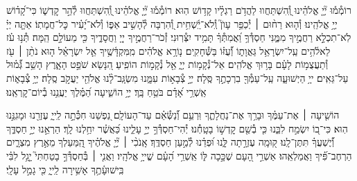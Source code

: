 \documentclass[twoside, openany, parskip=half, 11pt]{book}
\begin{document}
\newcommand{\negline}{\vspace{-\baselineskip}}

\negline

%
רוֹמְ֯מ֡וּ יְ֘יָ֤ אֱלֹהֵ֗ינוּ וְֽ֭֯הִשְׁתַּחֲווּ לַהֲדֹ֥ם רַגְלָ֗יו קָד֥וֹשׁ הֽוּא׃
רוֹמְ֯מ֡וּ יְ֘יָ֤ אֱלֹהֵ֗ינוּ וְֽ֭֯הִשְׁתַּחֲווּ לְ֯הַ֣ר קׇדְשׁ֑וֹ כִּי־קָ֝ד֗וֹשׁ יְיָ֥ אֱלֹהֵֽינוּ׃
%
וְ֯ה֤וּא רַח֨וּם ׀ יְ֯כַפֵּ֥ר עָוֺן֮ וְֽ֯לֹא־יַֽ֫שְׁחִ֥ית וְ֭֯הִרְבָּה לְ֯הָשִׁ֣יב אַפּ֑וֹ
וְ֯לֹא־יָ֝עִ֗יר כׇּל־חֲמָתֽוֹ׃
%
אַתָּ֤ה יְיָ֗ לֹֽא־תִכְלָ֣א רַחֲמֶ֣יךָ מִמֶּ֑נִּי חַסְדְּ֯ךָ֥ וַ֝אֲמִתְּ֯ךָ֗ תָּמִ֥יד יִצְּ֯רֽוּנִי׃
זְ֯כֹר־רַחֲמֶ֣יךָ יְיָ֭ וַחֲסָדֶ֑יךָ כִּ֖י מֵעוֹלָ֣ם הֵֽמָּה׃
תְּ֯נ֥וּ עֹ֗ז לֵאלֹ֫הִ֥ים עַֽל־יִשְׂרָאֵ֥ל גַּאֲוָת֑וֹ וְ֯֝עֻזּ֗וֹ בַּשְּׁ֯חָקִֽים׃
נ֤וֹרָ֥א אֱלֹהִ֗ים מִֽמִּקְדָּ֫שֶׁ֥יךָ אֵ֤ל יִשְׂרָאֵ֗ל
ה֤וּא נֹתֵ֨ן ׀ עֹ֖ז וְ֯תַעֲצֻמ֥וֹת לָעָ֗ם בָּר֥וּךְ אֱלֹהִֽים׃
אֵל־נְ֯קָמ֥וֹת יְיָ֑ אֵ֖ל נְ֯קָמ֣וֹת הוֹפִֽיעַ׃
הִ֭נָּשֵׂא שֹׁפֵ֣ט הָאָ֑רֶץ הָשֵׁ֥ב גְּ֯֝מ֗וּל עַל־גֵּאִֽים׃
ייָ֥ הַיְשׁוּעָ֑ה עַֽל־עַמְּ֯ךָ֖ בִרְכָתֶ֣ךָ סֶּֽלָה׃
 יְיָ֣ צְ֯בָא֣וֹת עִמָּ֑נוּ מִשְׂגָּֽב־לָ֨נוּ אֱלֹהֵ֖י יַעֲקֹ֣ב סֶֽלָה׃
 יְיָ֥ צְ֯בָא֑וֹת אַֽשְׁרֵ֥י אָ֝דָ֗ם בֹּטֵ֥חַ בָּֽךְ׃
 יְיָ֥ הוֹשִׁ֑יעָה הַ֝מֶּ֗לֶךְ יַעֲנֵ֥נוּ בְ֯יוֹם־קׇרְאֵֽנוּ׃

הוֹשִׁ֤יעָה ׀ אֶת־עַמֶּ֗ךָ וּבָרֵ֥ךְ אֶת־נַחֲלָתֶ֑ךָ וּֽרְעֵ֥ם וְ֯֝נַשְּׂ֯אֵ֗ם עַד־הָעוֹלָֽם׃
נַ֭פְשֵׁנוּ חִכְּ֯תָ֣ה לַֽייָ֑ עֶזְרֵ֖נוּ וּמָגִנֵּ֣נוּ הֽוּא׃
כִּי־ב֭וֹ יִשְׂמַ֣ח לִבֵּ֑נוּ כִּ֤י בְ֯שֵׁ֖ם קׇדְשׁ֣וֹ בָטָֽחְ֯נוּ׃
יְ֯הִי־חַסְדְּ֯ךָ֣ יְיָ֣ עָלֵ֑ינוּ כַּ֝אֲשֶׁ֗ר יִחַ֥לְנוּ לָֽךְ׃
הַרְאֵ֣נוּ יְיָ֣ חַסְדֶּ֑ךָ וְ֯֝יֶשְׁעֲךָ֗ תִּתֶּן־לָֽנוּ׃
ק֭וּמָֽה עֶזְרָ֣תָה לָּ֑נוּ וּ֝פְדֵ֗נוּ לְ֯מַ֣עַן חַסְדֶּֽךָ׃
אָֽנֹכִ֨י ׀ יְ֘יָ֤ אֱלֹהֶ֗יךָ הַֽ֭מַּעַלְךָ מֵאֶ֣רֶץ מִצְרָ֑יִם הַרְחֶב־פִּ֗֝יךָ וַאֲמַלְאֵֽהוּ׃
אַשְׁרֵ֣י הָ֭עָם שֶׁכָּ֣כָה לּ֑וֹ אַֽשְׁרֵ֥י הָ֝עָ֗ם שֱׁייָ֥ אֱלֹהָֽיו׃
וַאֲנִ֤י ׀ בְּ֯חַסְדְּ֯ךָ֣ בָטַחְתִּי֮ יָ֤גֵ֥ל לִבִּ֗י בִּֽישׁוּעָ֫תֶ֥ךָ אָשִׁ֥ירָה לַֽייָ֑ כִּ֖י גָמַ֣ל עָלָֽי׃

\negline
\end{document}
